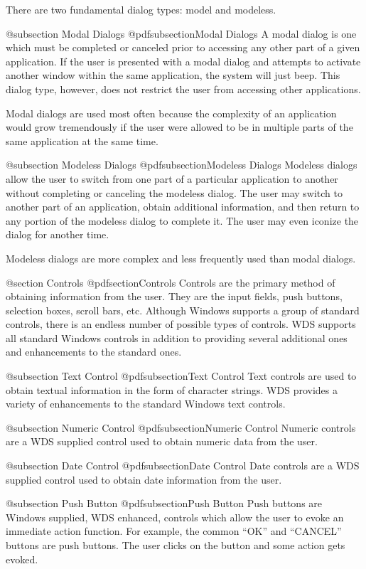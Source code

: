 There are two fundamental dialog types: model and modeless.

@subsection Modal Dialogs
@pdfsubsection{Modal Dialogs}
A modal dialog is one which must be completed or canceled prior to
accessing any other part of a given application.  If the user is
presented with a modal dialog and attempts to activate another window
within the same application, the system will just beep.  This dialog
type, however, does not restrict the user from accessing other
applications.

Modal dialogs are used most often because the complexity of an application
would grow tremendously if the user were allowed to be in multiple parts
of the same application at the same time.

@subsection Modeless Dialogs
@pdfsubsection{Modeless Dialogs}
Modeless dialogs allow the user to switch from one part of a particular
application to another without completing or canceling the modeless dialog.
The user may switch to another part of an application, obtain additional
information, and then return to any portion of the modeless dialog to
complete it.  The user may even iconize the dialog for another time.

Modeless dialogs are more complex and less frequently used than modal
dialogs.

@section Controls
@pdfsection{Controls}
Controls are the primary method of obtaining information from the user.
They are the input fields, push buttons, selection boxes, scroll bars,
etc.  Although Windows supports a group of standard controls, there is
an endless number of possible types of controls.  WDS supports all
standard Windows controls in addition to providing several additional
ones and enhancements to the standard ones.

@subsection Text Control
@pdfsubsection{Text Control}
Text controls are used to obtain textual information in the form
of character strings.  WDS provides a variety of enhancements to
the standard Windows text controls.


@subsection Numeric Control
@pdfsubsection{Numeric Control}
Numeric controls are a WDS supplied control used to obtain numeric
data from the user.

@subsection Date Control
@pdfsubsection{Date Control}
Date controls are a WDS supplied control used to obtain date information
from the user.

@subsection Push Button
@pdfsubsection{Push Button}
Push buttons are Windows supplied, WDS enhanced, controls which allow
the user to evoke an immediate action function.  For example, the
common ``OK'' and ``CANCEL'' buttons are push buttons.  The user
clicks on the button and some action gets evoked.

